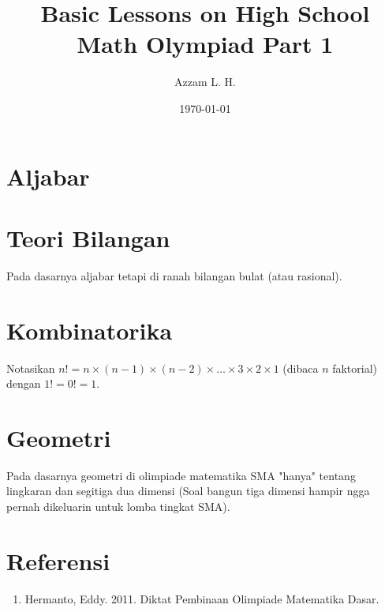 \title{Basic Lessons on High School Math Olympiad Part 1}
\date{\today}
\author{Azzam L. H.}
\maketitle
\renewcommand*\contentsname{Daftar Isi}
\tableofcontents

\newpage
\section{Aljabar}





\newpage
\section{Teori Bilangan}
Pada dasarnya aljabar tetapi di ranah bilangan bulat (atau rasional).








        
\newpage    
\section{Kombinatorika}
Notasikan $n!=n \times (n-1) \times (n-2) \times \dots \times 3 \times 2 \times 1$ (dibaca $n$ faktorial) dengan $1!=0!=1$.









\newpage
\section{Geometri}
Pada dasarnya geometri di olimpiade matematika SMA "hanya" tentang lingkaran dan segitiga dua dimensi (Soal bangun tiga dimensi hampir ngga pernah dikeluarin untuk lomba tingkat SMA).







\section{Referensi}
\begin{enumerate}
\item Hermanto, Eddy. 2011. Diktat Pembinaan Olimpiade Matematika Dasar.
\end{enumerate}

